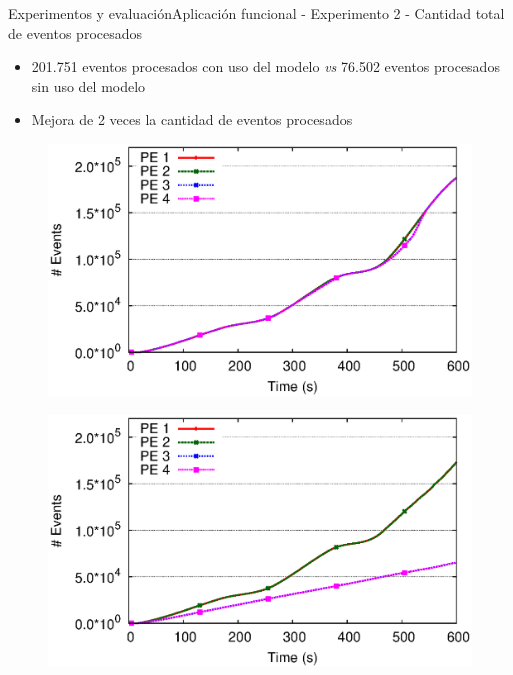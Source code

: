 \begin{frame}{Experimentos y evaluación}{Aplicación funcional - Experimento 2 - Cantidad total de eventos procesados}

\begin{itemize}
\item 201.751 eventos procesados con uso del modelo \textit{vs} 76.502 eventos procesados sin uso del modelo
\item Mejora de 2 veces la cantidad de eventos procesados
\end{itemize}

\begin{multicols}{2}
\begin{figure}[p]
	\centering
	\includegraphics[scale=0.4]{images/exp/app1/dynamic/adaptative/exp2-eventCount.eps}
\end{figure}

\begin{figure}[p]
	\centering
	\includegraphics[scale=0.4]{images/exp/app1/dynamic/baseline/exp2-eventCount.eps}
\end{figure}
\end{multicols}
\end{frame}

